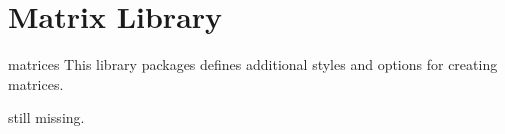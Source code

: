 %
%
%


\section{Matrix Library}

\begin{pgflibrary}{matrices}
  This library packages defines additional styles and options for
  creating matrices.
\end{pgflibrary}

still missing.



